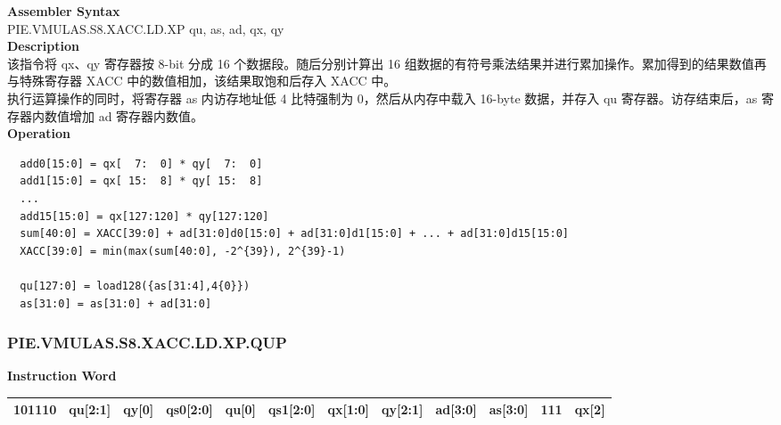 \textbf{Assembler Syntax} \\
PIE.VMULAS.S8.XACC.LD.XP qu, as, ad, qx, qy \\
\textbf{Description} \\
该指令将 qx、qy 寄存器按 8-bit 分成 16 个数据段。随后分别计算出 16 组数据的有符号乘法结果并进行累加操作。累加得到的结果数值再与特殊寄存器 XACC 中的数值相加，该结果取饱和后存入 XACC 中。\\
执行运算操作的同时，将寄存器 as 内访存地址低 4 比特强制为 0，然后从内存中载入 16-byte 数据，并存入 qu 寄存器。访存结束后，as 寄存器内数值增加 ad 寄存器内数值。\\
\textbf{Operation}
\begin{lstlisting}
  add0[15:0] = qx[  7:  0] * qy[  7:  0]
  add1[15:0] = qx[ 15:  8] * qy[ 15:  8]
  ...
  add15[15:0] = qx[127:120] * qy[127:120]
  sum[40:0] = XACC[39:0] + ad[31:0]d0[15:0] + ad[31:0]d1[15:0] + ... + ad[31:0]d15[15:0]
  XACC[39:0] = min(max(sum[40:0], -2^{39}), 2^{39}-1)

  qu[127:0] = load128({as[31:4],4{0}})
  as[31:0] = as[31:0] + ad[31:0]
\end{lstlisting}

\newpage
\subsubsection{PIE.VMULAS.S8.XACC.LD.XP.QUP}\label{instruction:PIEVMULASS8XACCLDXPQUP}
\setlength\tabcolsep{6pt}
\textbf{Instruction Word} \\
\begin{tabular}{|c|c|c|c|c|c|c|c|c|c|c|c|}
	\hline
	101110 & qu[2:1] & qy[0] & qs0[2:0] & qu[0] & qs1[2:0] & qx[1:0] & qy[2:1] & ad[3:0] & as[3:0] & 111 & qx[2] \\
	\hline
\end{tabular}

